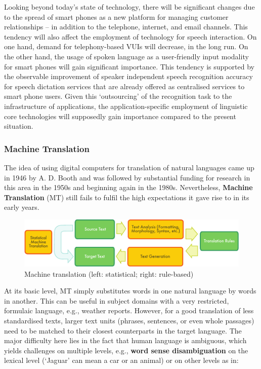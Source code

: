 \begin{multicols}{2}
Looking beyond today’s state of technology, there will be significant changes due to the spread of smart phones as a new platform for managing customer relationships – in addition to the telephone, internet, and email channels. This tendency will also affect the employment of technology for speech interaction. On one hand, demand for telephony-based VUIs will decrease, in the long run. On the other hand, the usage of spoken language as a user-friendly input modality for smart phones will gain significant importance. This tendency is supported by the observable improvement of speaker independent speech recognition accuracy for speech dictation services that are already offered as centralised services to smart phone users. Given this ‘outsourcing’ of the recognition task to the infrastructure of applications, the application-specific employment of linguistic core technologies will supposedly gain importance compared to the present situation. 

\subsubsection{Machine Translation}
    The idea of using digital computers for translation of natural languages came up in 1946 by A. D. Booth and was followed by substantial funding for research in this area in the 1950s and beginning again in the 1980s. Nevertheless, \textbf{Machine Translation} (MT) still fails to fulfil the high expectations it gave rise to in its early years. 
    

\begin{figure}[htb]
  \center
  \includegraphics[width=\textwidth]{../_media/english/machine_translation}
  \caption{Machine translation (left: statistical; right: rule-based)}
  \label{fig:mtarch_en}
\end{figure}

At its basic level, MT simply substitutes words in one natural language by words in another. This can be useful in subject domains with a very restricted, formulaic language, e.g., weather reports. However, for a good translation of less standardised texts, larger text units (phrases, sentences, or even whole passages) need to be matched to their closest counterparts in the target language. The major difficulty here lies in the fact that human language is ambiguous, which yields challenges on multiple levels, e.g., \textbf{word sense disambiguation} on the lexical level (‘Jaguar’ can mean a car or an animal) or on other levels as in:


\end{multicols}
